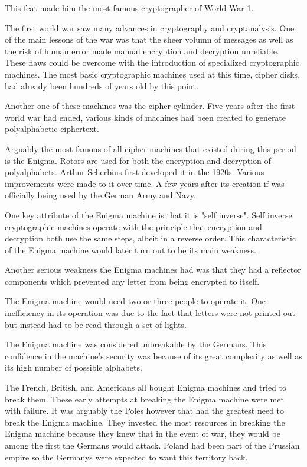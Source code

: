 \documentclass{article}
\begin{document}
    This feat made him the most famous cryptographer of World War 1.


    The first world war saw many advances in cryptography and cryptanalysis.
    One of the main lessons of the war was that the sheer volumn of
    messages as well as the risk of human error made manual encryption and
    decryption unreliable. These flaws could be overcome with the
    introduction of specialized cryptographic machines.
    The most basic cryptographic machines used at this time, cipher disks,
    had already been hundreds of years old by this point.

    Another one of these machines was the cipher cylinder.
    Five years after the first world war had ended, various kinds of
    machines had been created to generate polyalphabetic ciphertext.

    Arguably the most famous of all cipher machines that existed during this
    period is the Enigma. Rotors are used for both the encryption and decryption
    of polyalphabets. Arthur Scherbius first developed it in the 1920s.
    Various improvements were made to it over time. A few years
    after its creation if was officially being used by the German Army and Navy.

    One key attribute of the Enigma machine is that it is "self inverse".
    Self inverse cryptographic machines operate with the principle
    that encryption and decryption both use the same steps, albeit
    in a reverse order.
    This characteristic of the Enigma machine would later turn out
    to be its main weakness.


    Another serious weakness the Enigma machines had was that they
    had a reflector components which prevented any letter from being
    encrypted to itself.

    The Enigma machine would need two or three people to operate it.
    One inefficiency in its operation was due to the fact that letters
    were not printed out but instead had to be read through a set of lights.

    The Enigma machine was considered unbreakable by the Germans. This confidence
    in the machine's security was because of its great complexity as well
    as its high number of possible alphabets.

    The French, British, and Americans all bought Enigma machines and tried
    to break them.
    These early attempts at breaking the Enigma machine were met with failure.
    It was arguably the Poles however that had the greatest need to break the Enigma
    machine. They invested the most resources in breaking the Enigma machine
    because they knew that in the event of war, they would be among the first the Germans
    would attack. Poland had been part of the Prussian empire so the Germanys
    were expected to want this territory back.
\end{document}
